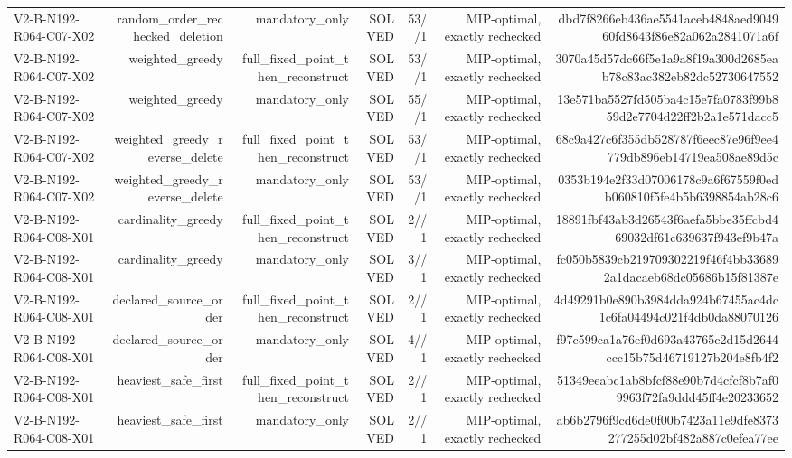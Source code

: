 {\begin{longtable}{lrrrrrr}
V2-B-N192-R064-C07-X02 & random\_order\_rechecked\_deletion & mandatory\_only & SOLVED & 53//1 & MIP-optimal, exactly rechecked & dbd7f8266eb436ae5541aceb4848aed904960fd8643f86e82a062a2841071a6f \\
V2-B-N192-R064-C07-X02 & weighted\_greedy & full\_fixed\_point\_then\_reconstruct & SOLVED & 53//1 & MIP-optimal, exactly rechecked & 3070a45d57dc66f5e1a9a8f19a300d2685eab78c83ac382eb82dc52730647552 \\
V2-B-N192-R064-C07-X02 & weighted\_greedy & mandatory\_only & SOLVED & 55//1 & MIP-optimal, exactly rechecked & 13e571ba5527fd505ba4c15e7fa0783f99b859d2e7704d22ff2b2a1e571dacc5 \\
V2-B-N192-R064-C07-X02 & weighted\_greedy\_reverse\_delete & full\_fixed\_point\_then\_reconstruct & SOLVED & 53//1 & MIP-optimal, exactly rechecked & 68c9a427c6f355db528787f6eec87e96f9ee4779db896eb14719ea508ae89d5c \\
V2-B-N192-R064-C07-X02 & weighted\_greedy\_reverse\_delete & mandatory\_only & SOLVED & 53//1 & MIP-optimal, exactly rechecked & 0353b194e2f33d07006178c9a6f67559f0edb060810f5fe4b5b6398854ab28c6 \\
V2-B-N192-R064-C08-X01 & cardinality\_greedy & full\_fixed\_point\_then\_reconstruct & SOLVED & 2//1 & MIP-optimal, exactly rechecked & 18891fbf43ab3d26543f6aefa5bbe35ffcbd469032df61c639637f943ef9b47a \\
V2-B-N192-R064-C08-X01 & cardinality\_greedy & mandatory\_only & SOLVED & 3//1 & MIP-optimal, exactly rechecked & fc050b5839cb219709302219f46f4bb336892a1dacaeb68dc05686b15f81387e \\
V2-B-N192-R064-C08-X01 & declared\_source\_order & full\_fixed\_point\_then\_reconstruct & SOLVED & 2//1 & MIP-optimal, exactly rechecked & 4d49291b0e890b3984dda924b67455ac4dc1c6fa04494c021f4db0da88070126 \\
V2-B-N192-R064-C08-X01 & declared\_source\_order & mandatory\_only & SOLVED & 4//1 & MIP-optimal, exactly rechecked & f97c599ca1a76ef0d693a43765c2d15d2644ccc15b75d46719127b204e8fb4f2 \\
V2-B-N192-R064-C08-X01 & heaviest\_safe\_first & full\_fixed\_point\_then\_reconstruct & SOLVED & 2//1 & MIP-optimal, exactly rechecked & 51349eeabc1ab8bfcf88e90b7d4cfcf8b7af09963f72fa9ddd45ff4e20233652 \\
V2-B-N192-R064-C08-X01 & heaviest\_safe\_first & mandatory\_only & SOLVED & 2//1 & MIP-optimal, exactly rechecked & ab6b2796f9cd6de0f00b7423a11e9dfe8373277255d02bf482a887c0efea77ee \\

\end{longtable}}
